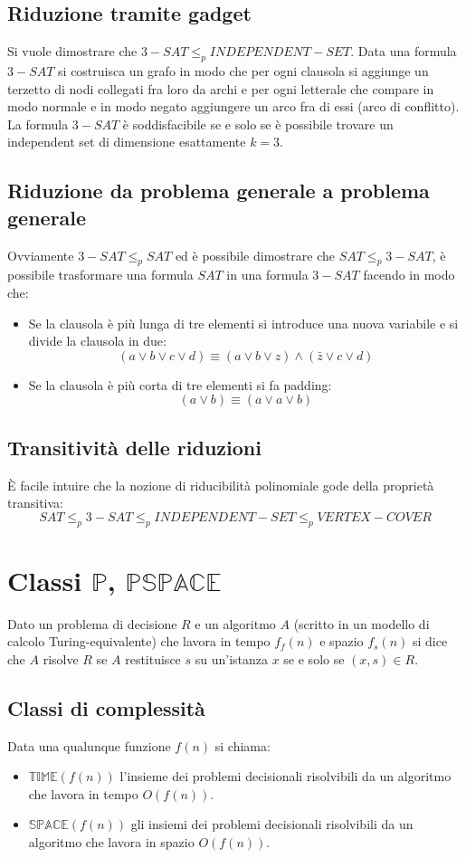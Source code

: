 \subsection{Riduzione tramite gadget}
Si vuole dimostrare che $3-SAT\le_p INDEPENDENT-SET$. Data una formula $3-SAT$ si costruisca un grafo in modo che per ogni clausola si aggiunge un terzetto di nodi collegati fra loro
da archi e per ogni letterale che compare in modo normale e in modo negato aggiungere un arco fra di essi (arco di conflitto). La formula $3-SAT$ \`e soddisfacibile se e solo se \`e
possibile trovare un independent set di dimensione esattamente $k=3$.
\subsection{Riduzione da problema generale a problema generale}
Ovviamente $3-SAT\le_p SAT$ ed \`e possibile dimostrare che $SAT\le_p 3-SAT$, \`e possibile trasformare una formula $SAT$ in una formula $3-SAT$ facendo in modo che:
\begin{itemize}
	\item Se la clausola \`e pi\`u lunga di tre elementi si introduce una nuova variabile e si divide la clausola in due:
		$$(a\lor b\lor c\lor d)\equiv (a\lor b\lor z)\land(\bar{z}\lor c\lor d)$$
	\item Se la clausola \`e pi\`u corta di tre elementi si fa padding:
		$$(a\lor b)\equiv (a\lor a\lor b)$$
\end{itemize}
\subsection{Transitivit\`a delle riduzioni}
\`E facile intuire che la nozione di riducibilit\`a polinomiale gode della propriet\`a transitiva:
$$SAT \le_p 3-SAT \le_p INDEPENDENT-SET \le_p VERTEX-COVER$$
\section{Classi $\mathbf{\mathbb{P}}$, $\mathbf{\mathbb{PSPACE}}$}
Dato un problema di decisione $R$ e un algoritmo $A$ (scritto in un modello di calcolo Turing-equivalente) che lavora in tempo $f_f(n)$ e spazio $f_s(n)$ si dice che $A$ risolve $R$ se
$A$ restituisce $s$ su un'istanza $x$ se e solo se $(x, s)\in R$. 
\subsection{Classi di complessit\`a}
Data una qualunque funzione $f(n)$ si chiama:
\begin{itemize}
	\item $\mathbb{TIME}(f(n))$ l'insieme dei problemi decisionali risolvibili da un algoritmo che lavora in tempo $O(f(n))$.
	\item $\mathbb{SPACE}(f(n))$ gli insiemi dei problemi decisionali risolvibili da un algoritmo che lavora in spazio $O(f(n))$.
\end{itemize}
